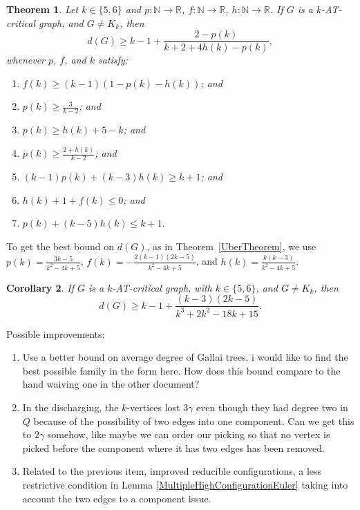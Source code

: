 \documentclass[12pt]{article}
\theoremstyle{plain}
\newtheorem{thm}{Theorem}[section]
\newtheorem{cor}[thm]{Corollary}
\theoremstyle{definition}
\theoremstyle{remark}
\newcommand{\IN}{\mathbb{N}}
\newcommand{\IR}{\mathbb{R}}
\newcommand{\func}[3]{#1\colon #2 \rightarrow #3}
\begin{document}
\begin{thm}\label{Uber56}
	Let $k \in\{5,6\}$ and $\func{p}{\IN}{\IR}$, $\func{f}{\IN}{\IR}$, $\func{h}{\IN}{\IR}$.  If $G$ is a $k$-AT-critical graph, and $G\ne K_k$, then 
	\[d(G) \ge k-1 + \frac{2-p(k)}{k+2 + 4h(k) - p(k)},\]
	whenever $p$, $f$, and $k$ satisfy:
	\begin{enumerate}
	\item $f(k) \ge (k-1)(1- p(k) - h(k))$; and	
	    \item $p(k) \ge \frac{3}{k-2}$; and
		\item $p(k) \ge h(k) + 5 - k$; and
		\item $p(k) \ge \frac{2+h(k)}{k-2}$; and
		\item $(k-1)p(k) + (k-3)h(k) \ge k+1$; and
		\item $h(k) + 1 + f(k) \le 0$; and
		\item $p(k) + (k-5)h(k) \le k+1$.
	\end{enumerate}
\end{thm}

To get the best bound on $d(G)$, as in Theorem~\ref{UberTheorem}, we use $p(k) = \frac{3k-5}{k^2 - 4k + 5}$, $f(k) = -\frac{2(k-1)(2k-5)}{k^2 - 4k + 5}$, and $h(k) = \frac{k(k-3)}{k^2 - 4k + 5}$.
\begin{cor}\label{MinorCor}
If $G$ is a $k$-AT-critical graph, with $k\in\{5,6\}$, and $G\ne K_k$, then
 \[d(G) \ge k-1 + \frac{(k-3)(2k-5)}{k^3 + 2k^2 - 18k + 15}.\]
\end{cor}

Possible improvements:

\begin{enumerate}
	\item Use a better bound on average degree of Gallai trees.  i would like to find the best possible family in the form here.  How does this bound compare to the hand waiving one in the other document?
	\item In the discharging, the $k$-vertices lost $3\gamma$ even though they had degree two in $Q$ because of the possibility of two edges into one component.  Can we get this to $2\gamma$ somehow, like maybe we can order our picking so that no vertex is picked before the component where it has two edges has been removed.   
	\item Related to the previous item, improved reducible configurations, a less restrictive condition in Lemma \ref{MultipleHighConfigurationEuler} taking into account the two edges to a component issue.
\end{enumerate}
\end{document}
